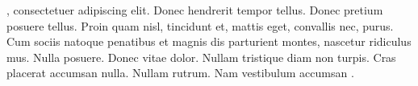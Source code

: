 \documentclass{article}
\begin{document}
\beginnumbering\pstart

 , consectetuer adipiscing elit. Donec
hendrerit tempor tellus. Donec pretium posuere tellus. Proin quam nisl, tincidunt et,
mattis eget, convallis nec, purus. Cum sociis natoque penatibus et magnis dis parturient
montes, nascetur ridiculus mus. Nulla posuere. Donec vitae dolor. Nullam tristique diam
non turpis. Cras placerat accumsan nulla. Nullam rutrum. Nam vestibulum accumsan
.

\pend\endnumbering

\bigskip

\end{document}
